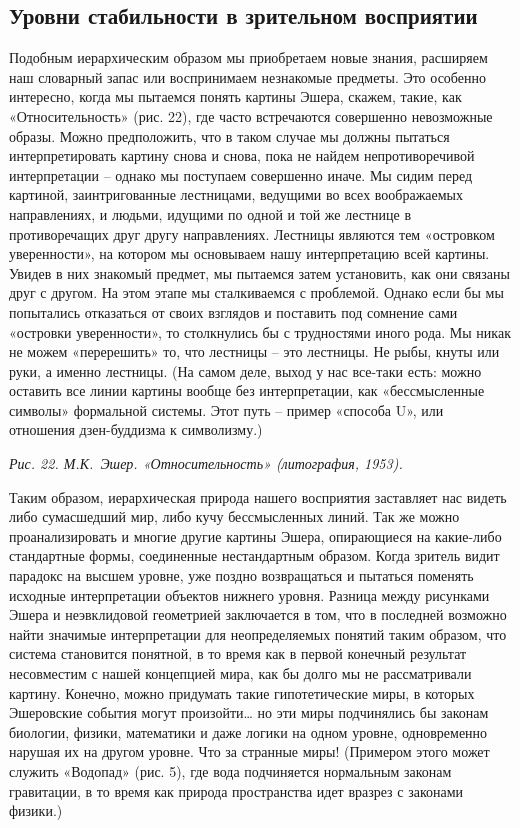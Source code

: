 \documentclass[../main.tex]{subfiles}
\begin{document}
\subsection{Уровни стабильности в зрительном восприятии}

Подобным иерархическим образом мы приобретаем новые знания, расширяем наш словарный запас или воспринимаем незнакомые предметы. Это особенно интересно, когда мы пытаемся понять картины Эшера, скажем, такие, как «Относительность» (рис. 22), где часто встречаются совершенно невозможные образы. Можно предположить, что в таком случае мы должны пытаться интерпретировать картину снова и снова, пока не найдем непротиворечивой интерпретации \--- однако мы поступаем совершенно иначе. Мы сидим перед картиной, заинтригованные лестницами, ведущими во всех воображаемых направлениях, и людьми, идущими по одной и той же лестнице в противоречащих друг другу направлениях. Лестницы являются тем «островком уверенности», на котором мы основываем нашу интерпретацию всей картины. Увидев в них знакомый предмет, мы пытаемся затем установить, как они связаны друг с другом. На этом этапе мы сталкиваемся с проблемой. Однако если бы мы попытались отказаться от своих взглядов и поставить под сомнение сами «островки уверенности», то столкнулись бы с трудностями иного рода. Мы никак не можем «перерешить» то, что лестницы \--- это лестницы. Не рыбы, кнуты или руки, а именно лестницы. (На самом деле, выход у нас все-таки есть: можно оставить все линии картины вообще без интерпретации, как «бессмысленные символы» формальной системы. Этот путь \--- пример «способа U», или отношения дзен-буддизма к символизму.)

\emph{Рис. 22. М.К.~Эшер. «Относительность» (литография, 1953).}

Таким образом, иерархическая природа нашего восприятия заставляет нас видеть либо сумасшедший мир, либо кучу бессмысленных линий. Так же можно проанализировать и многие другие картины Эшера, опирающиеся на какие-либо стандартные формы, соединенные нестандартным образом. Когда зритель видит парадокс на высшем уровне, уже поздно возвращаться и пытаться поменять исходные интерпретации объектов нижнего уровня. Разница между рисунками Эшера и неэвклидовой геометрией заключается в том, что в последней возможно найти значимые интерпретации для неопределяемых понятий таким образом, что система становится понятной, в то время как в первой конечный результат несовместим с нашей концепцией мира, как бы долго мы не рассматривали картину. Конечно, можно придумать такие гипотетические миры, в которых Эшеровские события могут произойти\ldots{} но эти миры подчинялись бы законам биологии, физики, математики и даже логики на одном уровне, одновременно нарушая их на другом уровне. Что за странные миры! (Примером этого может служить «Водопад» (рис. 5), где вода подчиняется нормальным законам гравитации, в то время как природа пространства идет вразрез с законами физики.)
\end{document}
